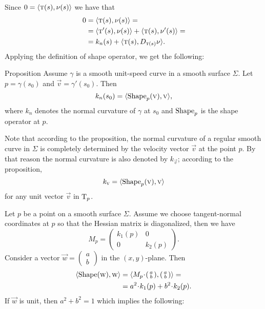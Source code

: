 Since $0=\langle \text{\sc{t}}(s),\nu(s)\rangle$ we have 
that 
\begin{align*}
0&=\langle \text{\sc{t}}(s),\nu(s)\rangle=
\\
&=\langle \text{\sc{t}}'(s),\nu(s)\rangle+\langle \text{\sc{t}}(s),\nu'(s)\rangle=
\\
&=k_n(s)+\langle \text{\sc{t}}(s),D_{\text{\sc{t}}(s)}\nu\rangle.
\end{align*}
Applying the definition of shape operator,
we get the following:

\begin{thm}{Proposition}\label{prop:normal-shape}
Assume $\gamma$ is a smooth unit-speed curve in a smooth surface $\Sigma$.
Let $p=\gamma(s_0)$ and $\vec v=\gamma'(s_0)$.
Then 
\[k_n(s_0)=\langle \mathop{\rm Shape}\nolimits_p(\text{\sc{v}}),\text{\sc{v}}\rangle,\]
where $k_n$ denotes the normal curvature of $\gamma$ at $s_0$ and $\mathop{\rm Shape}\nolimits_p$ is the shape operator at $p$.
\end{thm}

Note that according to the proposition, the normal curvature of a regular smooth curve in $\Sigma$ is completely determined by the velocity vector $\vec v$ at the point $p$.
By that reason the normal curvature is also denoted by $k_{\vec v}$;
according to the proposition,
\[k_{\text{\sc{v}}}=\langle \mathop{\rm Shape}\nolimits_p(\text{\sc{v}}),\text{\sc{v}}\rangle\]
for any unit vector $\vec v$ in $\mathrm{T}_p$.

Let $p$ be a point on a smooth surface $\Sigma$.
Assume we choose tangent-normal coordinates at $p$ so that the Hessian matrix is diagonalized, then we have
\[M_p=\begin{pmatrix}
   k_1(p)
   &0
   \\
   0
   &k_2(p)
  \end{pmatrix}.
\]
Consider a vector ${\vec w}=(\begin{smallmatrix}a\\b
\end{smallmatrix})$ in the $(x,y)$-plane.
Then
\begin{align*}
\langle \Shape(\vec w),\vec w\rangle
&=\langle M_p\cdot(\begin{smallmatrix}a\\b
\end{smallmatrix}),(\begin{smallmatrix}a\\b
\end{smallmatrix})\rangle=
\\
&=a^2\cdot k_1(p) +b^2\cdot k_2(p). 
\end{align*}
If ${\vec w}$ is unit, then $a^2+b^2=1$ which implies the following:

